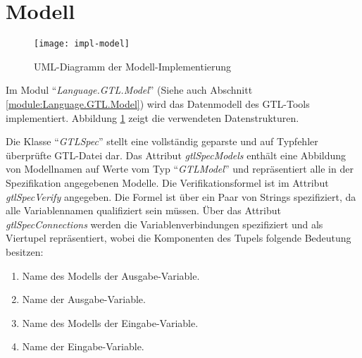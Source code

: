 \section{Modell}
\begin{figure}
  \centering
  \texttt{[image: impl-model]}
  \caption{UML-Diagramm der Modell-Implementierung}
  \label{fig:model-impl}
\end{figure}
Im Modul "`\emph{Language.GTL.Model}"' (Siehe auch Abschnitt \ref{module:Language.GTL.Model}) wird das Datenmodell des GTL-Tools implementiert.
Abbildung \ref{fig:model-impl} zeigt die verwendeten Datenstrukturen.

Die Klasse "`\emph{GTLSpec}"' stellt eine vollständig geparste und auf Typfehler überprüfte GTL-Datei dar.
Das Attribut \emph{gtlSpecModels} enthält eine Abbildung von Modellnamen auf Werte vom Typ "`\emph{GTLModel}"' und repräsentiert alle in der Spezifikation angegebenen Modelle.
Die Verifikationsformel ist im Attribut \emph{gtlSpecVerify} angegeben.
Die Formel ist über ein Paar von Strings spezifiziert, da alle Variablennamen qualifiziert sein müssen.
Über das Attribut \emph{gtlSpecConnections} werden die Variablenverbindungen spezifiziert und als Viertupel repräsentiert, wobei die Komponenten des Tupels folgende Bedeutung besitzen:
\begin{enumerate}
\item Name des Modells der Ausgabe-Variable.
\item Name der Ausgabe-Variable.
\item Name des Modells der Eingabe-Variable.
\item Name der Eingabe-Variable.
\end{enumerate}
